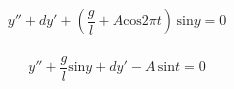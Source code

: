 \documentclass[11pt]{amsart}
\theoremstyle{remark}
\begin{document}
$$y'' +dy'+(\frac{g}{l} + A  \text{cos} 2\pi t) \,\text{sin}y=0$$\\

$$y''  +\frac{g}{l} \text{sin} y + d y' - A\, \text{sin} t=0$$
\end{document}
